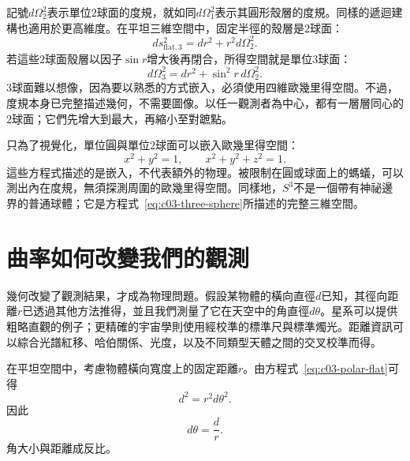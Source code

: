 記號\(d\Omega_2^2\)表示單位\(2\)球面的度規，就如同\(d\Omega_1^2\)表示其圓形殼層的度規。同樣的遞迴建構也適用於更高維度。在平坦三維空間中，固定半徑的殼層是\(2\)球面：
\begin{equation}
ds_{\text{flat},3}^2 = dr^2 + r^2 d\Omega_2^2.
\label{eq:c03-flat-three-polar}
\end{equation}
若這些\(2\)球面殼層以因子\(\sin r\)增大後再閉合，所得空間就是單位\(3\)球面：
\begin{equation}
d\Omega_3^2 = dr^2 + \sin^2 r\, d\Omega_2^2.
\label{eq:c03-three-sphere}
\end{equation}
\(3\)球面難以想像，因為要以熟悉的方式嵌入，必須使用四維歐幾里得空間。不過，度規本身已完整描述幾何，不需要圖像。以任一觀測者為中心，都有一層層同心的\(2\)球面；它們先增大到最大，再縮小至對蹠點。

\begin{classroomqa}
\end{classroomqa}

只為了視覺化，單位圓與單位\(2\)球面可以嵌入歐幾里得空間：
\begin{equation}
x^2+y^2=1,
\qquad
x^2+y^2+z^2=1.
\end{equation}
這些方程式描述的是嵌入，不代表額外的物理。被限制在圓或球面上的螞蟻，可以測出內在度規，無須探測周圍的歐幾里得空間。同樣地，\(S^3\)不是一個帶有神祕邊界的普通球體；它是方程式~\eqref{eq:c03-three-sphere}所描述的完整三維空間。

\section{曲率如何改變我們的觀測}

幾何改變了觀測結果，才成為物理問題。假設某物體的橫向直徑\(d\)已知，其徑向距離\(r\)已透過其他方法推得，並且我們測量了它在天空中的角直徑\(d\theta\)。星系可以提供粗略直觀的例子；更精確的宇宙學則使用經校準的標準尺與標準燭光。距離資訊可以綜合光譜紅移、哈伯關係、光度，以及不同類型天體之間的交叉校準而得。

在平坦空間中，考慮物體橫向寬度上的固定距離\(r\)。由方程式~\eqref{eq:c03-polar-flat}可得
\begin{equation}
d^2 = r^2 d\theta^2.
\label{eq:c03-flat-angle-step}
\end{equation}
因此
\begin{equation}
d\theta = \frac{d}{r}.
\label{eq:c03-flat-angle}
\end{equation}
角大小與距離成反比。


